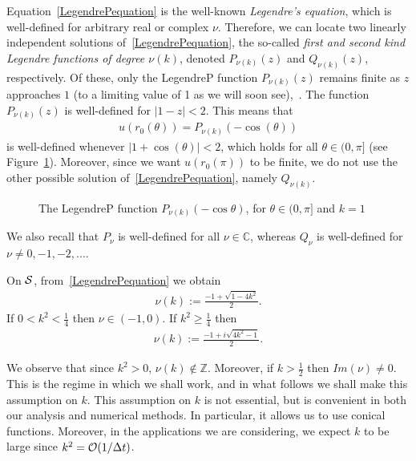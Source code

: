 Equation~\eqref{LegendrePequation} is the well-known {\it Legendre's
equation}, which is well-defined for arbitrary real or complex $\nu$.
Therefore, we can locate two linearly independent solutions
of~\eqref{LegendrePequation}, the so-called {\it first and second kind
Legendre functions of degree $\nu(k)$}, denoted $ P_{\nu(k)}(z)$ and
$Q_{\nu(k)}(z)$, respectively. Of these, only the  LegendreP function
$P_{\nu(k)}(z)$ remains finite as $z$ approaches $1$ (to a limiting
value of 1 as we will soon see),~\cite{lebedev}.  The function
$P_{\nu(k)}(z)$ is well-defined for $|1-z|<2$.  This means that
\begin{align*}
  u(r_0(\theta)) =  P_{\nu(k)}(-\cos(\theta))
\end{align*}
is well-defined whenever $|1+\cos(\theta)|<2$, which holds for all
$\theta \in(0,\pi]$ (see Figure~\ref{f:legendreP}).  Moreover, since we
want $u(r_0(\pi))$ to be finite, we do not use the other possible
solution of~\eqref{LegendrePequation}, namely $Q_{\nu(k)}$.
\begin{figure}[htps]
  \centering
  
  \caption{\label{f:legendreP} The LegendreP function
  $P_{\nu(k)}(-\cos\theta)$, for $\theta \in (0,\pi]$ and $k=1$}
\end{figure}  
We also recall that $P_{\nu}$ is well-defined for all $\nu \in
\mathbb{C}$, whereas $Q_\nu$ is well-defined for $\nu \not=
0,-1,-2,...$. 

On $\S$, from~\eqref{LegendrePequation} we obtain
\begin{align*}  
  \nu(k):=\frac{-1+\sqrt{1-4k^2}}{2}.
\end{align*}
If $0<k^2<\frac{1}{4}$ then $\nu \in (-1,0)$. If $k^2\geq\frac{1}{4}$ then 
\begin{align*}  
  \nu(k):=\frac{-1+i\sqrt{4k^2-1}}{2}.
\end{align*}

We observe that since $k^{2}>0$, $\nu(k) \notin \mathbb{Z}$. Moreover,
if $k>\frac{1}{2}$ then $Im(\nu)\not=0$.  This is the regime in which we
shall work, and in what follows we shall make this assumption on $k$.
This assumption on $k$ is not essential, but is convenient in both our
analysis and numerical methods.  In particular, it allows us to use
conical functions.  Moreover, in the applications we are considering, we
expect $k$ to be large since $k^{2} = \bigO(1/\Delta t)$.

